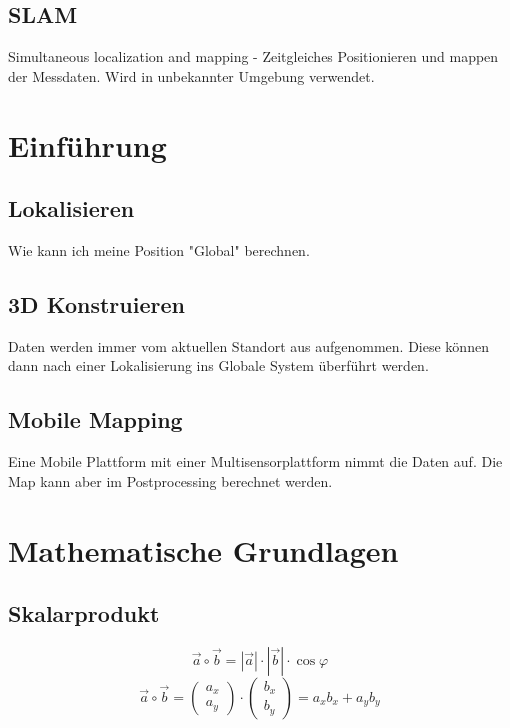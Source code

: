 \section{SLAM}
\label{uebersicht:sec:SLAM}
	Simultaneous localization and mapping - Zeitgleiches Positionieren und mappen der Messdaten. Wird in unbekannter Umgebung verwendet.
	
\chapter{Einführung}
\label{Einführung}	

\section{Lokalisieren}
\label{einfuehrung:sec:lokalisieren}
	Wie kann ich meine Position "Global" berechnen.
	
\section{3D Konstruieren}
\label{einfuehrung:sec:3DKonstruieren}
	Daten werden immer vom aktuellen Standort aus aufgenommen. Diese können dann nach einer Lokalisierung ins 
	Globale System überführt werden.

\section{Mobile Mapping}
\label{einfuehrung:sec:MobileMapping}
	Eine Mobile Plattform mit einer Multisensorplattform nimmt die Daten auf. Die Map kann aber im Postprocessing berechnet werden.



\chapter{Mathematische Grundlagen}
\label{MathematischeGrundlagen}




\section{Skalarprodukt}

	\begin{equation}
		\vec{a} \circ \vec{b} = |\vec{a}| \cdot |\vec{b}| \cdot \cos\varphi 
	\end{equation}
	\begin{equation}
		\vec{a} \circ \vec{b} =
		\left(
		\begin{array}{c}
		a_{x} \\
		a_{y}
		\end{array}
		\right) 
		\cdot 
		\left(
		\begin{array}{c}
		b_{x} \\
		b_{y}
		\end{array}
		\right)
		=
		a_{x}b_{x}
		+
		a_{y}b_{y} 
	\end{equation}

